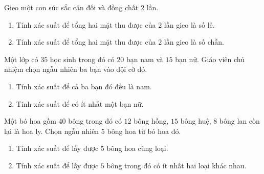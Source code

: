 \begin{bt}%
	Gieo một con súc sắc cân đối và đồng chất $2$ lần.
	\begin{enumerate}
		\item Tính xác suất để tổng hai mặt thu được của $2$ lần gieo là số lẻ.
		\item Tính xác suất để tổng hai mặt thu được của $2$ lần gieo là số chẵn.
	\end{enumerate}
\end{bt}

\begin{bt}%
	Một lớp có $35$ học sinh trong đó có $20$ bạn nam và $15$ bạn nữ. Giáo viên chủ nhiệm chọn ngẫu nhiên ba bạn vào đội cờ đỏ.
	\begin{enumerate}
		\item Tính xác suất để cả ba bạn đó đều là nam.
		\item Tính xác suất để có ít nhất một bạn nữ.
	\end{enumerate}
\end{bt}

\begin{bt}%
	Một bó hoa gồm $40$ bông trong đó có $12$ bông hồng, $15$ bông huệ, $8$ bông lan còn lại là hoa ly. Chọn ngẫu nhiên $5$ bông hoa từ bó hoa đó.
	\begin{enumerate}
		\item Tính xác suất để lấy được $5$ bông hoa cùng loại.
		\item Tính xác suất để lấy được $5$ bông trong đó có ít nhất hai loại khác nhau.
	\end{enumerate}
\end{bt}


